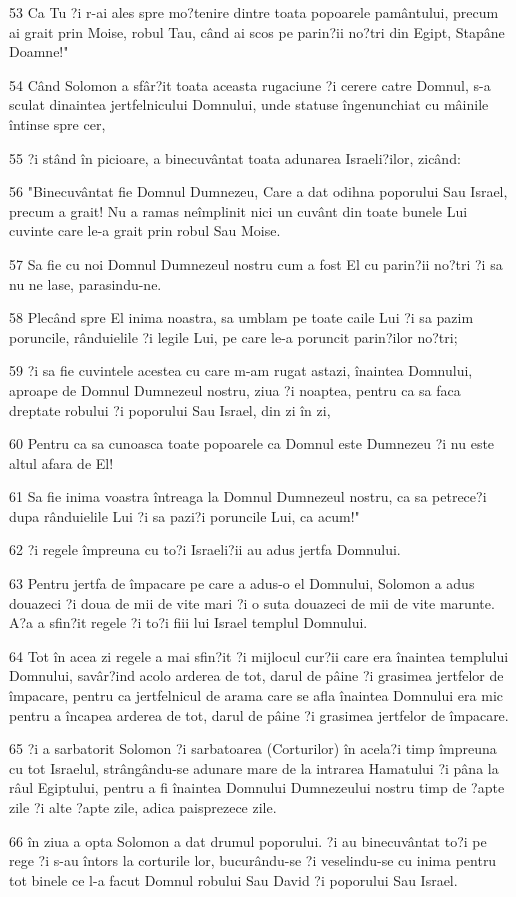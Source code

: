 \par 53 Ca Tu ?i r-ai ales spre mo?tenire dintre toata popoarele pamântului, precum ai grait prin Moise, robul Tau, când ai scos pe parin?ii no?tri din Egipt, Stapâne Doamne!"
\par 54 Când Solomon a sfâr?it toata aceasta rugaciune ?i cerere catre Domnul, s-a sculat dinaintea jertfelnicului Domnului, unde statuse îngenunchiat cu mâinile întinse spre cer,
\par 55 ?i stând în picioare, a binecuvântat toata adunarea Israeli?ilor, zicând:
\par 56 "Binecuvântat fie Domnul Dumnezeu, Care a dat odihna poporului Sau Israel, precum a grait! Nu a ramas neîmplinit nici un cuvânt din toate bunele Lui cuvinte care le-a grait prin robul Sau Moise.
\par 57 Sa fie cu noi Domnul Dumnezeul nostru cum a fost El cu parin?ii no?tri ?i sa nu ne lase, parasindu-ne.
\par 58 Plecând spre El inima noastra, sa umblam pe toate caile Lui ?i sa pazim poruncile, rânduielile ?i legile Lui, pe care le-a poruncit parin?ilor no?tri;
\par 59 ?i sa fie cuvintele acestea cu care m-am rugat astazi, înaintea Domnului, aproape de Domnul Dumnezeul nostru, ziua ?i noaptea, pentru ca sa faca dreptate robului ?i poporului Sau Israel, din zi în zi,
\par 60 Pentru ca sa cunoasca toate popoarele ca Domnul este Dumnezeu ?i nu este altul afara de El!
\par 61 Sa fie inima voastra întreaga la Domnul Dumnezeul nostru, ca sa petrece?i dupa rânduielile Lui ?i sa pazi?i poruncile Lui, ca acum!"
\par 62 ?i regele împreuna cu to?i Israeli?ii au adus jertfa Domnului.
\par 63 Pentru jertfa de împacare pe care a adus-o el Domnului, Solomon a adus douazeci ?i doua de mii de vite mari ?i o suta douazeci de mii de vite marunte. A?a a sfin?it regele ?i to?i fiii lui Israel templul Domnului.
\par 64 Tot în acea zi regele a mai sfin?it ?i mijlocul cur?ii care era înaintea templului Domnului, savâr?ind acolo arderea de tot, darul de pâine ?i grasimea jertfelor de împacare, pentru ca jertfelnicul de arama care se afla înaintea Domnului era mic pentru a încapea arderea de tot, darul de pâine ?i grasimea jertfelor de împacare.
\par 65 ?i a sarbatorit Solomon ?i sarbatoarea (Corturilor) în acela?i timp împreuna cu tot Israelul, strângându-se adunare mare de la intrarea Hamatului ?i pâna la râul Egiptului, pentru a fi înaintea Domnului Dumnezeului nostru timp de ?apte zile ?i alte ?apte zile, adica paisprezece zile.
\par 66 în ziua a opta Solomon a dat drumul poporului. ?i au binecuvântat to?i pe rege ?i s-au întors la corturile lor, bucurându-se ?i veselindu-se cu inima pentru tot binele ce l-a facut Domnul robului Sau David ?i poporului Sau Israel.

